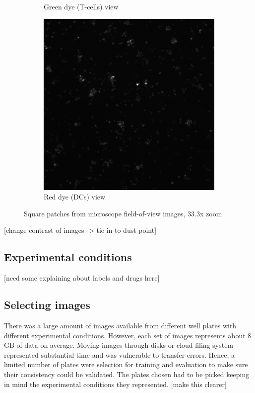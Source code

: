 \begin{figure}[h]
\begin{subfigure}[h!]{0.3\textwidth}
        \caption{Green dye (T-cells) view}
        \label{fig:fov_fitc}
    \end{subfigure}
    \begin{subfigure}[h!]{0.3\textwidth}
        \includegraphics[width=\textwidth]{dissertation/figures/example_TexasRed.png}
        \caption{Red dye (DCs) view}
        \label{fig:fov_tr}
    \end{subfigure}
    \caption{Square patches from microscope field-of-view images, 33.3x zoom}
    \label{fig:fov}
\end{figure}

[change contrast of images -> tie in to dust point]

\subsection{Experimental conditions}

[need some explaining about labels and drugs here]

\subsection{Selecting images}

There was a large amount of images available from different well plates with different experimental conditions. However, each set of images represents about 8 GB of data on average. Moving images through disks or cloud filing system represented substantial time and was vulnerable to transfer errors. Hence, a limited number of plates were selection for training and evaluation to make sure their consistency could be validated. The plates chosen had to be picked keeping in mind the experimental conditions they represented. [make this clearer]

